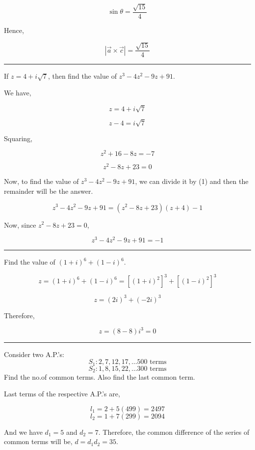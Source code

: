 \documentclass[twocolumn]{article}
\begin{document}
\[
    \sin \theta = \frac{\sqrt{15}}{4} 
\]

Hence, 

\[
    \boxed{|\vec{a}\times \vec{c}| = \frac{\sqrt{15}}{4} }
\]

\hrule 

\begin{question}
    If \(z = 4 + i \sqrt{7} \), then find the value of \(z^3 - 4z^2 - 9z + 91\).   
\end{question}

We have, 

\[
    z = 4 + i \sqrt{7} 
\]

\[
    z-4 = i\sqrt{7} 
\]

Squaring, 

\[
    z^{2} + 16 - 8z = -7
\]

\[
    z^{2} -8z + 23 = 0 \tag{1}
\]

Now, to find the value of \(z^3 - 4z^{2} - 9z + 91\), we can divide it by (1) and then the remainder will be the answer. 

\[
    z^3 - 4z^{2}  - 9z + 91 = (z^{2}  - 8z + 23)(z + 4) - 1
\]

Now, since \(z^{2} - 8z + 23 = 0\), 

\[
    \boxed{z^3 - 4z^{2}  - 9z + 91 = -1}
\]

\hrule

\begin{question}
    Find the value of \((1+i)^6 + (1-i)^6\).
\end{question}

\[
    z = (1+ i)^6 + (1 - i)^6 = [(1+i)^2]^3 + [(1- i)^2]^3
\]

\[
    z = (2i)^3 + (-2i)^3
\]

Therefore, 

\[
    \boxed{z = (8-8)i^3 = 0}
\]

\hrule

\begin{question}
    Consider two A.P.'s: 
    \[
        S_1 : 2, 7, 12, 17, \dots 500 \text{ terms}
    \] 
    \[
        S_2 : 1, 8, 15, 22, \dots 300 \text{ terms}
    \]
    Find the no.of common terms. Also find the last common term. 
\end{question}

Last terms of the respective A.P.'s are, 

\[
    l_1 = 2 + 5(499) = 2497
\]
\[
    l_2 = 1 + 7(299) = 2094
\]


And we have \(d_1 = 5\) and \(d_2 = 7\). Therefore, the common difference of the series of common terms will be, \(d = d_1 d_2 = 35\). 
\end{document}
